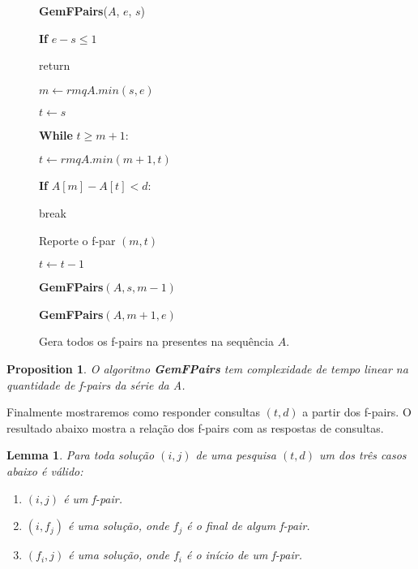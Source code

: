 \documentclass[12pt]{article}
\newtheorem{lem}[thm]{Lemma}
\newtheorem{prop}[thm]{Proposition}
\begin{document}
\clearpage
\begin{figure}
\begin{framed}
{\bf GemFPairs}($A$, $e$, $s$)

\hspace{1cm} {\bf If} $e - s \le 1$

\hspace{2cm} return

\hspace{1cm} $m \leftarrow rmqA.min(s, e)$

\hspace{1cm} $t \leftarrow s$

\hspace{1cm} {\bf While} $t \ge m + 1$:

\hspace{2cm} $t \leftarrow rmqA.min(m + 1, t)$

\hspace{2cm} {\bf If} $A[m] - A[t] < d$:

\hspace{3cm} break

\hspace{2cm} Reporte o f-par $(m, t)$

\hspace{2cm} $t \leftarrow t - 1$

\hspace{1cm} {\bf GemFPairs}$(A, s, m - 1)$

\hspace{1cm} {\bf GemFPairs}$(A, m + 1, e)$

\caption{Gera todos os f-pairs na presentes na sequência $A$.}
\label{gemfpair}
\end{framed}
\end{figure}

\begin{prop}
O algoritmo {\bf GemFPairs} tem complexidade de tempo linear na quantidade
de f-pairs da série da A.
\end{prop}

Finalmente mostraremos como responder consultas $(t, d)$ a partir dos f-pairs.
O resultado abaixo mostra a relação dos f-pairs com as respostas de consultas.

\begin{lem}
\label{fundamental}
Para toda solução $(i, j)$ de uma pesquisa $(t, d)$ um dos três 
casos abaixo é válido:
\begin{enumerate}
\item $(i, j)$ é um f-pair.
\item $(i, f_j)$ é uma solução, onde $f_j$ é o final de algum f-pair.
\item $(f_i, j)$ é uma solução, onde $f_i$ é o início de um f-pair.
\end{enumerate}
\end{lem}
\end{document}
